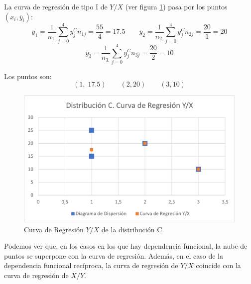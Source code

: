 \begin{ejercicio}
\begin{enumerate}
\begin{enumerate}
            La curva de regresión de tipo I de $Y/X$ (ver figura \ref{fig:Ej7.2.C.2}) pasa por los puntos $(x_i, \bar{y}_i)$:
            \begin{equation*}
                \bar{y}_1 = \frac{1}{n_{1.}}\sum_{j=0}^4 y_j^C n_{1j} = \frac{55}{4} = 17.5
                \qquad
                \bar{y}_2 = \frac{1}{n_{2.}}\sum_{j=0}^4 y_j^C n_{2j} = \frac{20}{1} = 20
            \end{equation*}
            \begin{equation*}
                \bar{y}_3 = \frac{1}{n_{3.}}\sum_{j=0}^4 y_j^C n_{3j} = \frac{20}{2} = 10
            \end{equation*}

            Los puntos son:
            \begin{equation*}
                (1,\;17.5)\qquad (2,20) \qquad (3,10)
            \end{equation*}
            \begin{figure}[H]
                \centering
                \includegraphics[width=0.6\linewidth]{Imagenes/Ej7.2.C.2.png}
                \caption{Curva de Regresión $Y/X$ de la distribución C.}
                \label{fig:Ej7.2.C.2}
            \end{figure}
        \end{enumerate}

        Podemos ver que, en los casos en los que hay dependencia funcional, la nube de puntos se superpone con la curva de regresión. Además, en el caso de la dependencia funcional recíproca, la curva de regresión de $Y/X$ coincide con la curva de regresión de $X/Y$.
    \end{enumerate}
\end{ejercicio}


